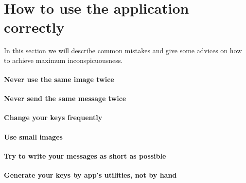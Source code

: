 \section{How to use the application correctly}
In this section we will describe common mistakes and give some advices on
how to achieve maximum inconspicuousness.

\paragraph{Never use the same image twice}

\paragraph{Never send the same message twice}

\paragraph{Change your keys frequently}

\paragraph{Use small images}

\paragraph{Try to write your messages as short as possible}

\paragraph{Generate your keys by app's utilities, not by hand}

